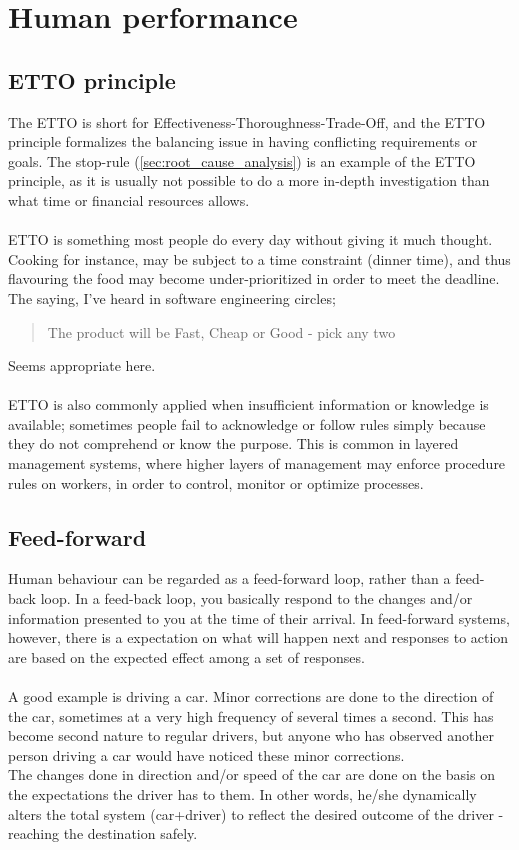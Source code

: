 \section{Human performance}




\subsection{ETTO principle}
The ETTO is short for Effectiveness-Thoroughness-Trade-Off, and the ETTO principle formalizes the balancing issue in having conflicting requirements or goals. The stop-rule (\ref{sec:root_cause_analysis}) is an example of the ETTO principle, as it is usually not possible to do a more in-depth investigation than what time or financial resources allows.\\
\\
ETTO is something most people do every day without giving it much thought. Cooking for instance, may be subject to a time constraint (dinner time), and thus flavouring the food may become under-prioritized in order to meet the deadline. The saying, I've heard in software engineering circles;
 \begin{quote}
 The product will be Fast, Cheap or Good - pick any two
\end{quote}
Seems appropriate here.\\
\\
ETTO is also commonly applied when insufficient information or knowledge is available; sometimes people fail to acknowledge or follow rules simply because they do not comprehend or know the purpose. This is common in layered management systems, where higher layers of management may enforce procedure rules on workers, in order to control, monitor or optimize processes.

\subsection{Feed-forward}
Human behaviour can be regarded as a feed-forward loop, rather than a feed-back loop. In a feed-back loop, you basically respond to the changes and/or information presented to you at the time of their arrival. In feed-forward systems, however, there is a expectation on what will happen next and responses to action are based on the expected effect among a set of responses.\\
\\
A good example is driving a car. Minor corrections are done to the direction of the car, sometimes at a very high frequency of several times a second. This has become second nature to regular drivers, but anyone who has observed another person driving a car would have noticed these minor corrections.\\
The changes done in direction and/or speed of the car are done on the basis on the expectations the driver has to them. In other words, he/she dynamically alters the total system (car+driver) to reflect the desired outcome of the driver - reaching the destination safely.
